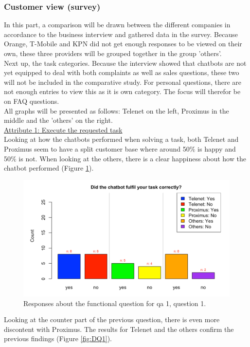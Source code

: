 \subsubsection{Customer view (survey)}
In this part, a comparison will be drawn between the different companies in accordance to the business interview and gathered data in the survey. Because Orange, T-Mobile and KPN did not get enough responses to be viewed on their own, these three providers will be grouped together in the group 'others'.\\
\break
Next up, the task categories. Because the interview showed that chatbots are not yet equipped to deal with both complaints as well as sales questions, these two will not be included in the comparative study. For personal questions, there are not enough entries to view this as it is own category. The focus will therefor be on FAQ questions.\\
\break
All graphs will be presented as follows: Telenet on the left, Proximus in the middle and the 'others' on the right.\\
\break
\ul{Attribute 1: Execute the requested task}\\
\break
Looking at how the chatbots performed when solving a task, both Telenet and Proximus seem to have a split customer base where around 50\% is happy and 50\% is not. When looking at the others, there is a clear happiness about how the chatbot performed (Figure \ref{fig:Q1}).\\
\begin{figure}[!htb]
	\centering
	\includegraphics[width=375pt]{../LaTeX/Figures/Comparative/Q1.png}
	\caption{Responses about the functional question for \acrshort{qa} 1, question 1.}\label{fig:Q1}
\end{figure}
\break
Looking at the counter part of the previous question, there is even more discontent with Proximus. The results for Telenet and the others confirm the previous findings (Figure \ref{fig:DQ1}).
